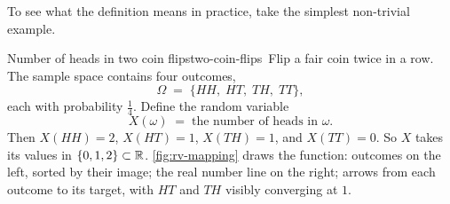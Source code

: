 To see what the definition means in practice, take the simplest non-trivial example.

%
%
%
%
%

\begin{example}{Number of heads in two coin flips}{two-coin-flips}
\,Flip a fair coin twice in a row. The sample space contains four outcomes,
\[
\Omega \;=\; \{HH,\; HT,\; TH,\; TT\},
\]
each with probability $\tfrac{1}{4}$. Define the random variable
\[
X(\omega) \;=\; \text{the number of heads in } \omega.
\]
Then $X(HH) = 2$, $X(HT) = 1$, $X(TH) = 1$, and $X(TT) = 0$. So $X$ takes its values in $\{0, 1, 2\} \subset \mathbb{R}$. \cref{fig:rv-mapping} draws the function: outcomes on the left, sorted by their image; the real number line on the right; arrows from each outcome to its target, with $HT$ and $TH$ visibly converging at $1$.
\end{example}

